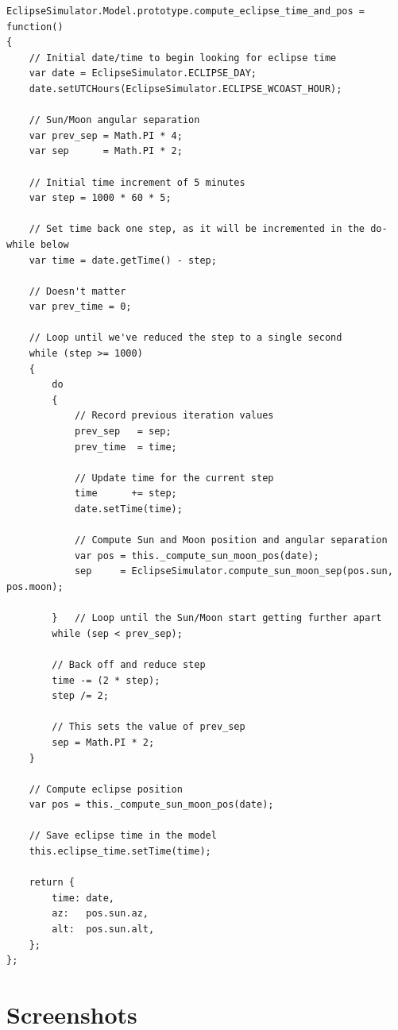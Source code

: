 \documentclass[10pt, onecolumn, draftclsnofoot, letterpaper, compsoc]{IEEEtran}
\begin{document}
\begin{verbatim}
EclipseSimulator.Model.prototype.compute_eclipse_time_and_pos = function()
{
    // Initial date/time to begin looking for eclipse time
    var date = EclipseSimulator.ECLIPSE_DAY;
    date.setUTCHours(EclipseSimulator.ECLIPSE_WCOAST_HOUR);

    // Sun/Moon angular separation
    var prev_sep = Math.PI * 4;
    var sep      = Math.PI * 2;

    // Initial time increment of 5 minutes
    var step = 1000 * 60 * 5;

    // Set time back one step, as it will be incremented in the do-while below
    var time = date.getTime() - step;

    // Doesn't matter
    var prev_time = 0;

    // Loop until we've reduced the step to a single second
    while (step >= 1000)
    {
        do
        {
            // Record previous iteration values
            prev_sep   = sep;
            prev_time  = time;

            // Update time for the current step
            time      += step;
            date.setTime(time);

            // Compute Sun and Moon position and angular separation
            var pos = this._compute_sun_moon_pos(date);
            sep     = EclipseSimulator.compute_sun_moon_sep(pos.sun, pos.moon);

        }	// Loop until the Sun/Moon start getting further apart
        while (sep < prev_sep);

        // Back off and reduce step
        time -= (2 * step);
        step /= 2;

        // This sets the value of prev_sep
        sep = Math.PI * 2;
    }

    // Compute eclipse position
    var pos = this._compute_sun_moon_pos(date);

    // Save eclipse time in the model
    this.eclipse_time.setTime(time);

    return {
        time: date,
        az:   pos.sun.az,
        alt:  pos.sun.alt,
    };
};
\end{verbatim}

\newpage
\section{Screenshots}
\end{document}
